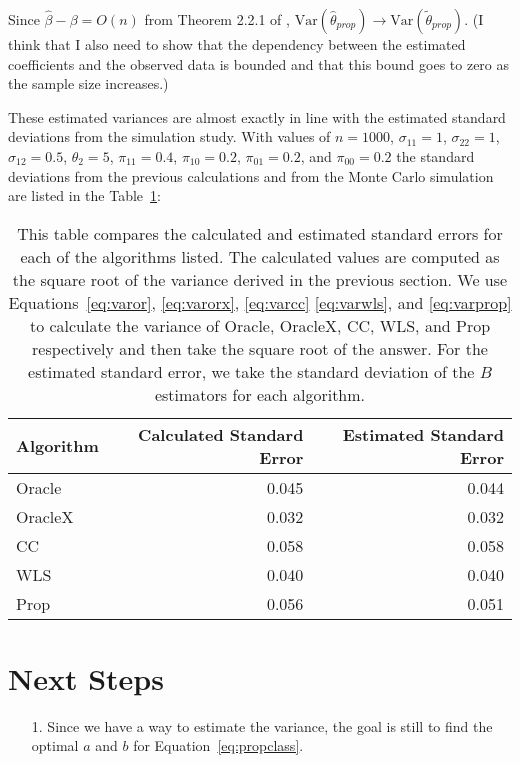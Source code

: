\documentclass[12pt]{article}
\newcommand{\Var}{{\text{Var}}}
\begin{document}
Since $\hat \beta - \beta = O(n)$ from Theorem 2.2.1 of \cite{fuller2009sampling}, 
$\Var(\hat \theta_{prop}) \to \Var(\tilde \theta_{prop})$. (I think that 
I also need to show that the dependency between the estimated 
coefficients and the observed data is bounded and that this bound goes 
to zero as the sample size increases.)

These estimated variances are almost exactly in line with the estimated
standard deviations from the simulation study. With values of $n = 1000$,
$\sigma_{11} = 1$, $\sigma_{22} = 1$, $\sigma_{12} = 0.5$, $\theta_2 = 5$,
$\pi_{11} = 0.4$, $\pi_{10} = 0.2$, $\pi_{01} = 0.2$, and $\pi_{00} = 0.2$
the standard deviations from the previous calculations and from the Monte Carlo
simulation are listed in the Table~\ref{tab:calmc}:

\begin{table}[!ht]
  \centering
  \label{tab:calmc}
  \caption{This table compares the calculated and estimated standard 
  errors for each of the algorithms listed. The calculated values are 
  computed as the square root of the variance derived in the previous 
  section. We use Equations~\ref{eq:varor}, \ref{eq:varorx}, \ref{eq:varcc}
  \ref{eq:varwls}, and \ref{eq:varprop} to calculate the variance of 
  Oracle, OracleX, CC, WLS, and Prop respectively and then take the square
  root of the answer. For the estimated standard error, we take the 
  standard deviation of the $B$ estimators for each algorithm.}
  \begin{tabular}{lrr}
    \toprule
    Algorithm & Calculated Standard Error & Estimated Standard Error \\
    \midrule
    Oracle  & 0.045 & 0.044 \\
    OracleX & 0.032 & 0.032 \\
    CC      & 0.058 & 0.058 \\
    WLS     & 0.040 & 0.040 \\
    Prop    & 0.056 & 0.051 \\
    \bottomrule
  \end{tabular}
\end{table}

\section*{Next Steps}

\begin{itemize}
  \item[1.] Since we have a way to estimate the variance, the goal is still 
    to find the optimal $a$ and $b$ for Equation~\ref{eq:propclass}.
\end{itemize}

\printbibliography
\end{document}
